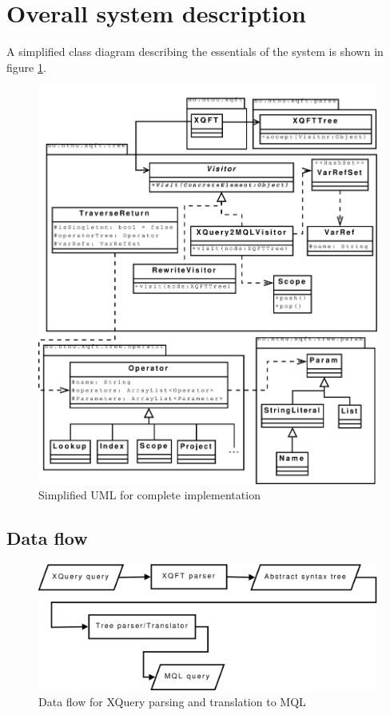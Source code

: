 \section{Overall system description}
A simplified class diagram describing the essentials of the system is shown in
figure \ref{fig:impl:sys:uml_complete}.

\begin{figure}[!htp]
\begin{center}
  \includegraphics[scale=0.45]{diagrams/complete_uml}
  \caption{Simplified UML for complete implementation}
  \label{fig:impl:sys:uml_complete}
\end{center}
\end{figure}

\subsection{Data flow}
\begin{figure}[!htp]
\begin{center}
  \includegraphics[scale=0.5]{diagrams/mql_dataflow}
  \caption{Data flow for XQuery parsing and translation to MQL}
  \label{fig:impl:sys:mql_dataflow}
\end{center}
\end{figure}
